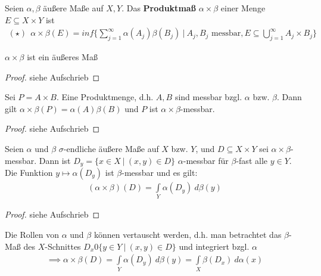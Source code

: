   \begin{definition}
    Seien $\alpha, \beta$ äußere Maße auf $X,Y$. Das \textbf{Produktmaß} $\alpha \times \beta$ einer Menge $E \subseteq X \times Y$ ist
    \begin{align*}
      (\star) \ \ \alpha \times \beta (E) = inf\{\sum\limits_{j=1}^{\infty} \alpha(A_j) \beta(B_j) \ | \ A_j, B_j \text{ messbar}, E \subseteq \bigcup\limits_{j=1}^{\infty} A_j \times B_j\}
    \end{align*}
  \end{definition}

  \begin{lemma}
    $\alpha \times \beta$ ist ein äußeres Maß
  \end{lemma}
  \begin{proof}
    siehe Aufschrieb
  \end{proof}

  \begin{lemma}
    Sei $P = A \times B$. Eine Produktmenge, d.h. $A,B$ sind messbar bzgl. $\alpha$ bzw. $\beta$. Dann gilt $\alpha \times \beta(P) = \alpha(A) \beta(B)$ und $P$ ist $\alpha \times \beta$-messbar.
  \end{lemma}
  \begin{proof}
    siehe Aufschrieb
  \end{proof}

  \begin{theorem}
    Seien $\alpha$ und $\beta$ $\sigma$-endliche äußere Maße auf $X$ bzw. $Y$, und $D \subseteq X \times Y$ sei $\alpha \times \beta$-messbar. Dann ist $D_y = \{x \in X \ | \ (x,y) \in D\}$ $\alpha$-messbar für $\beta$-fast alle $y \in Y$. Die Funktion $y \mapsto \alpha(D_y)$ ist $\beta$-messbar und es gilt:
    \begin{align*}
      (\alpha \times \beta)(D) = \int\limits_Y \alpha(D_y) \ d\beta(y)
    \end{align*}
  \end{theorem}
  \begin{proof}
    siehe Aufschrieb
  \end{proof}

  \begin{remark}
    Die Rollen von $\alpha$ und $\beta$ können vertauscht werden, d.h. man betrachtet das $\beta$-Maß des $X$-Schnittes $D_x 0 \{y \in Y \ | \ (x,y) \in D\}$ und integriert bzgl. $\alpha$
    \begin{align*}
      \implies \alpha \times \beta (D) = \int\limits_Y \alpha(D_y) \ d\beta(y) = \int\limits_X \beta(D_x) \ d\alpha(x)
    \end{align*}
  \end{remark}

